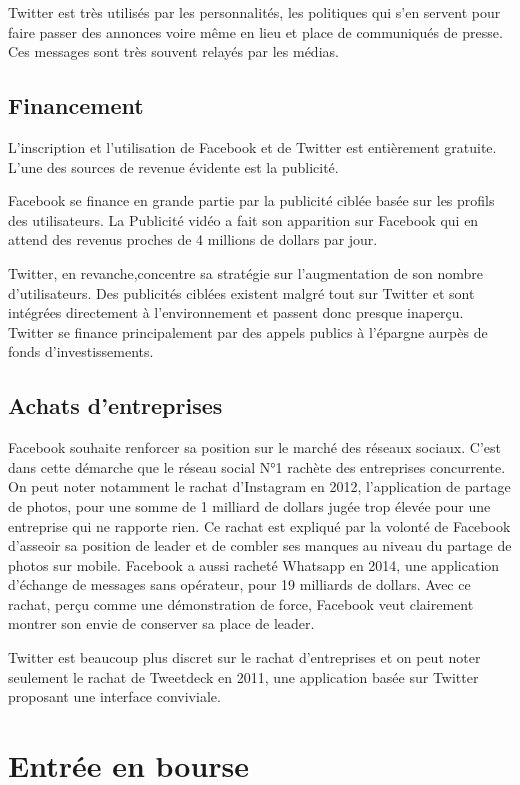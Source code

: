 \documentclass[a4paper,10pt]{article}
\begin{document}
Twitter est très utilisés par les personnalités, les politiques qui s'en servent pour faire passer des annonces voire même en lieu et place de communiqués de presse. Ces messages sont très souvent relayés par les médias.


\subsection{Financement}

L'inscription et l'utilisation de Facebook et de Twitter est entièrement gratuite. L'une des sources de revenue évidente est la publicité. 

Facebook se finance en grande partie par la publicité ciblée basée sur les profils des utilisateurs. La Publicité vidéo a fait son apparition sur Facebook qui en attend des revenus proches de 4 millions de dollars par jour.

Twitter, en revanche,concentre sa stratégie sur l'augmentation de son nombre d'utilisateurs. Des publicités ciblées existent malgré tout sur Twitter et sont intégrées directement à  l'environnement et passent donc presque inaperçu. Twitter se finance principalement par des appels publics à l'épargne aurpès de fonds d’investissements.

\subsection{Achats d'entreprises}

Facebook souhaite renforcer sa position sur le marché des réseaux sociaux. C'est dans cette démarche que le réseau social N°1 rachète des entreprises concurrente.  On peut noter notamment le rachat d'Instagram en 2012, l'application de partage de photos, pour une somme de 1 milliard de dollars jugée trop élevée pour une entreprise qui ne rapporte rien. Ce rachat est expliqué par la volonté de Facebook d’asseoir sa position de leader et de combler ses manques au niveau du partage de photos sur mobile.
Facebook a aussi racheté Whatsapp en 2014, une application d'échange de messages sans opérateur, pour 19 milliards de dollars. Avec ce rachat, perçu comme une démonstration de force, Facebook veut clairement montrer son envie de conserver sa place de leader.


Twitter est beaucoup plus discret sur le rachat d'entreprises et on peut noter seulement le rachat de Tweetdeck en 2011, une application basée sur Twitter proposant une interface conviviale.

\section{Entrée en bourse}
\end{document}
